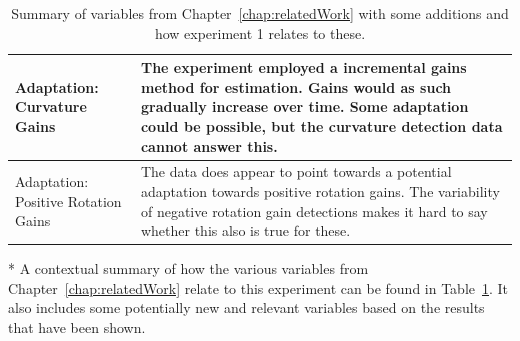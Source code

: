 \begin{table}[h!]
\begin{tabularx}{\textwidth}{|X|X|}
\hline
Adaptation: Curvature Gains & The experiment employed a incremental gains method for estimation. Gains would as such gradually increase over time. Some adaptation could be possible, but the curvature detection data cannot answer this. \\
\hline
Adaptation: Positive Rotation Gains & The data does appear to point towards a potential adaptation towards positive rotation gains. The variability of negative rotation gain detections makes it hard to say whether this also is true for these. \\
\hline
\end{tabularx}
\caption{Summary of variables from Chapter~\ref{chap:relatedWork} with some additions and how experiment 1 relates to these.}
\label{table:ex1VariableSummary}
\end{table}

* A contextual summary of how the various variables from Chapter~\ref{chap:relatedWork} relate to this experiment can be found in Table~\ref{table:ex1VariableSummary}. It also includes some potentially new and relevant variables based on the results that have been shown. 